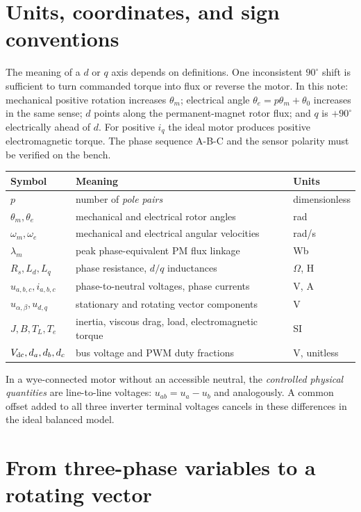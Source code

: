 \documentclass[10pt,letterpaper]{article}
\begin{document}
\section{Units, coordinates, and sign conventions}
The meaning of a $d$ or $q$ axis depends on definitions. One inconsistent $90^\circ$ shift is sufficient to turn commanded torque into flux or reverse the motor. In this note: mechanical positive rotation increases $\theta_m$; electrical angle $\theta_e=p\theta_m+\theta_0$ increases in the same sense; $d$ points along the permanent-magnet rotor flux; and $q$ is $+90^\circ$ electrically ahead of $d$. For positive $i_q$ the ideal motor produces positive electromagnetic torque. The phase sequence A-B-C and the sensor polarity must be verified on the bench.

\begin{center}
\begin{tabular}{@{}lll@{}}\toprule
Symbol & Meaning & Units\\\midrule
$p$ & number of \emph{pole pairs} & dimensionless\\
$\theta_m,\theta_e$ & mechanical and electrical rotor angles & rad\\
$\omega_m,\omega_e$ & mechanical and electrical angular velocities & rad/s\\
$\lambda_m$ & peak phase-equivalent PM flux linkage & Wb\\
$R_s,L_d,L_q$ & phase resistance, $d/q$ inductances & $\Omega$, H\\
$u_{a,b,c},i_{a,b,c}$ & phase-to-neutral voltages, phase currents & V, A\\
$u_{\alpha,\beta},u_{d,q}$ & stationary and rotating vector components & V\\
$J,B,T_L,T_e$ & inertia, viscous drag, load, electromagnetic torque & SI\\
$V_{\rm dc},d_a,d_b,d_c$ & bus voltage and PWM duty fractions & V, unitless\\\bottomrule
\end{tabular}
\end{center}
In a wye-connected motor without an accessible neutral, the \emph{controlled physical quantities} are line-to-line voltages: $u_{ab}=u_a-u_b$ and analogously. A common offset added to all three inverter terminal voltages cancels in these differences in the ideal balanced model.

\section{From three-phase variables to a rotating vector}
\end{document}
